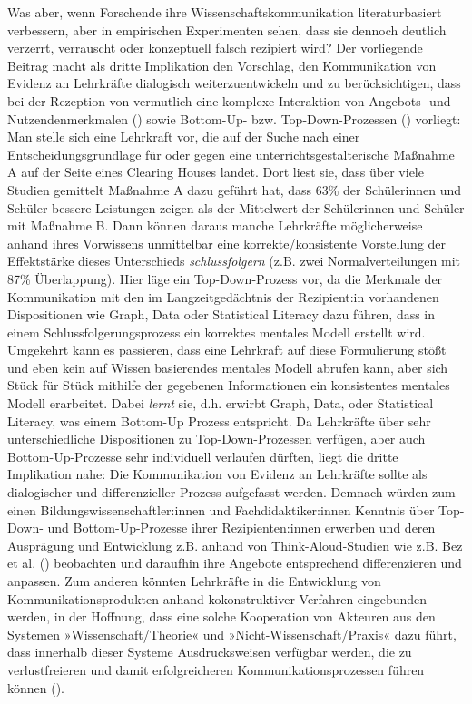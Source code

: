 \documentclass[
  man,
  floatsintext,
  longtable,
  nolmodern,
  notxfonts,
  notimes,
  colorlinks=true,linkcolor=blue,citecolor=blue,urlcolor=blue]{apa7}
\begin{document}
Was aber, wenn Forschende ihre Wissenschaftskommunikation
literaturbasiert verbessern, aber in empirischen Experimenten sehen,
dass sie dennoch deutlich verzerrt, verrauscht oder konzeptuell falsch
rezipiert wird? Der vorliegende Beitrag macht als dritte Implikation den
Vorschlag, den Kommunikation von Evidenz an Lehrkräfte dialogisch
weiterzuentwickeln und zu berücksichtigen, dass bei der Rezeption von
vermutlich eine komplexe Interaktion von Angebots- und
Nutzendenmerkmalen () sowie Bottom-Up- bzw. Top-Down-Prozessen
() vorliegt: Man stelle sich
eine Lehrkraft vor, die auf der Suche nach einer Entscheidungsgrundlage
für oder gegen eine unterrichtsgestalterische Maßnahme A auf der Seite
eines Clearing Houses landet. Dort liest sie, dass über viele Studien
gemittelt Maßnahme A dazu geführt hat, dass 63\% der Schülerinnen und
Schüler bessere Leistungen zeigen als der Mittelwert der Schülerinnen
und Schüler mit Maßnahme B. Dann können daraus manche Lehrkräfte
möglicherweise anhand ihres Vorwissens unmittelbar eine
korrekte/konsistente Vorstellung der Effektstärke dieses Unterschieds
\emph{schlussfolgern} (z.B. zwei Normalverteilungen mit 87\%
Überlappung). Hier läge ein Top-Down-Prozess vor, da die Merkmale der
Kommunikation mit den im Langzeitgedächtnis der Rezipient:in vorhandenen
Dispositionen wie Graph, Data oder Statistical Literacy dazu führen,
dass in einem Schlussfolgerungsprozess ein korrektes mentales Modell
erstellt wird. Umgekehrt kann es passieren, dass eine Lehrkraft auf
diese Formulierung stößt und eben kein auf Wissen basierendes mentales
Modell abrufen kann, aber sich Stück für Stück mithilfe der gegebenen
Informationen ein konsistentes mentales Modell erarbeitet. Dabei
\emph{lernt} sie, d.h. erwirbt Graph, Data, oder Statistical Literacy,
was einem Bottom-Up Prozess entspricht. Da Lehrkräfte über sehr
unterschiedliche Dispositionen zu Top-Down-Prozessen verfügen, aber auch
Bottom-Up-Prozesse sehr individuell verlaufen dürften, liegt die dritte
Implikation nahe: Die Kommunikation von Evidenz an Lehrkräfte sollte als
dialogischer und differenzieller Prozess aufgefasst werden. Demnach
würden zum einen Bildungswissenschaftler:innen und Fachdidaktiker:innen
Kenntnis über Top-Down- und Bottom-Up-Prozesse ihrer Rezipienten:innen
erwerben und deren Ausprägung und Entwicklung z.B. anhand von
Think-Aloud-Studien wie z.B. Bez et al. ()
beobachten und daraufhin ihre Angebote entsprechend differenzieren und
anpassen. Zum anderen könnten Lehrkräfte in die Entwicklung von
Kommunikationsprodukten anhand kokonstruktiver Verfahren eingebunden
werden, in der Hoffnung, dass eine solche Kooperation von Akteuren aus
den Systemen »Wissenschaft/Theorie« und »Nicht-Wissenschaft/Praxis« dazu
führt, dass innerhalb dieser Systeme Ausdrucksweisen verfügbar werden,
die zu verlustfreieren und damit erfolgreicheren Kommunikationsprozessen
führen können ().
\end{document}
